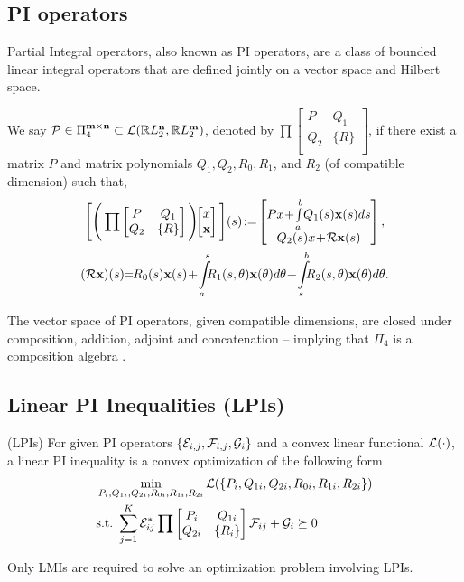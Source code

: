 \subsection{PI operators}
Partial Integral operators, also known as PI operators, are a class of bounded linear integral operators that are defined jointly on a vector space and Hilbert space.
\begin{definition}
	We say $\mathcal{P} \in {\Pi}_4^{\mathbf{m}\times\mathbf{n}} \subset \mathcal{L}(\mathbb{R} L_2^{\mathbf{n}}, \mathbb{R} L_2^{\mathbf{m}})$, denoted by $\prod \begin{bmatrix}
			P   & Q_1   \\
			Q_2 & \{R\} \\
		\end{bmatrix}$, if there exist a matrix $P$ and matrix polynomials $Q_1, Q_2, R_0, R_1$, and $R_2$ (of compatible dimension) such that,
	\begin{gather*}
		\Bigg[\Bigg(\prod \begin{bmatrix}
				P   & Q_1   \\
				Q_2 & \{R\} \\
			\end{bmatrix}\Bigg)\! \! \bmat{x \\ \mbf{x}}\Bigg](s)\! :=\! \bmat{Px\! +\!\int\limits_a^b\!Q_1(s)\mbf x(s)ds\\Q_2(s)x\!+\!\mcl R \mbf x(s)},\\
		(\mcl R \mbf x)(s)\!\! =\!\! R_0(s)\mbf x(s)\! +\! \int\limits_a^s\!\!\!R_1(s,\theta)\mbf x(\theta)d\theta\! +\!\int\limits_s^b\!\!\!R_2(s,\theta)\mbf x(\theta) d\theta.
	\end{gather*}

\end{definition}
The vector space of PI operators, given compatible dimensions, are closed under composition, addition, adjoint and concatenation -- implying that ${\Pi}_4$ is a composition algebra \cite{shivakumar2024GDPE}.

\subsection{Linear PI Inequalities (LPIs)}
\begin{definition}(LPIs)
	\label{def_LPI}
	For given PI operators $\{\mathcal{E}_{i,j}, \mathcal{F}_{i,j}, \mathcal{G}_i\}$ and a convex linear functional $\mathcal{L}(\cdot)$, a linear PI inequality is a convex optimization of the following form
	\begin{align}
		 & \min\limits_{P_i, Q_{1i}, Q_{2i}, R_{0i}, R_{1i}, R_{2i}}  \mathcal{L}(\{P_i, Q_{1i}, Q_{2i}, R_{0i}, R_{1i}, R_{2i}\})\notag \\
		 & \mathrm{s. t. }\ \sum\limits_{j = 1}^K \mathcal{E}_{ij}^*\prod \begin{bmatrix}
			                                                             P_i    & Q_{1i}  \\
			                                                             Q_{2i} & \{R_i\} \\
		                                                             \end{bmatrix}\mathcal{F}_{ij} +\mathcal{G}_i \succeq 0
	\end{align}
\end{definition}
Only LMIs are required to solve an optimization problem involving LPIs.
